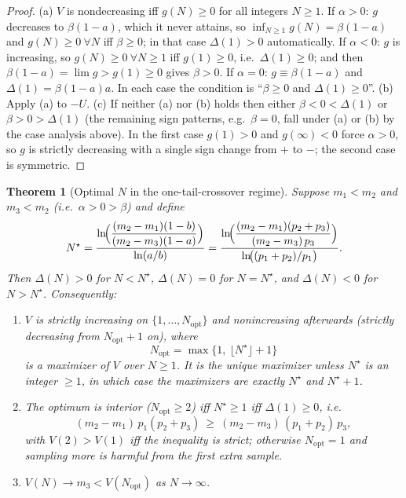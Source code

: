 \documentclass[11pt]{article}
\newtheorem{theorem}{Theorem}
\theoremstyle{definition}
\theoremstyle{remark}
\begin{document}
\begin{proof}
(a) $V$ is nondecreasing iff $g(N)\ge 0$ for all integers $N\ge1$.
If $\alpha>0$: $g$ decreases to $\beta(1-a)$, which it never attains, so
$\inf_{N\ge 1}g(N)=\beta(1-a)$ and $g(N)\ge0\ \forall N$ iff $\beta\ge0$; in that case
$\Delta(1)>0$ automatically.
If $\alpha<0$: $g$ is increasing, so $g(N)\ge0\ \forall N\ge1$ iff $g(1)\ge0$, i.e.\
$\Delta(1)\ge0$; and then $\beta(1-a)=\lim g>g(1)\ge0$ gives $\beta>0$.
If $\alpha=0$: $g\equiv\beta(1-a)$ and $\Delta(1)=\beta(1-a)a$.
In each case the condition is ``$\beta\ge0$ and $\Delta(1)\ge0$''.
(b) Apply (a) to $-U$.
(c) If neither (a) nor (b) holds then either $\beta<0<\Delta(1)$ or $\beta>0>\Delta(1)$
(the remaining sign patterns, e.g.\ $\beta=0$, fall under (a) or (b) by the case analysis
above). In the first case $g(1)>0$ and $g(\infty)<0$ force $\alpha>0$, so $g$ is strictly
decreasing with a single sign change from $+$ to $-$; the second case is symmetric.
\end{proof}

\begin{theorem}[Optimal $N$ in the one-tail-crossover regime]\label{thm:opt}
Suppose $m_1<m_2$ and $m_3<m_2$ (i.e.\ $\alpha>0>\beta$) and define
\begin{equation}\label{eq:Nstar}
N^\star=\frac{\ln\!\Bigl(\dfrac{(m_2-m_1)(1-b)}{(m_2-m_3)(1-a)}\Bigr)}{\ln(a/b)}
=\frac{\ln\!\Bigl(\dfrac{(m_2-m_1)(p_2+p_3)}{(m_2-m_3)\,p_3}\Bigr)}{\ln\!\bigl((p_1+p_2)/p_1\bigr)} .
\end{equation}
Then $\Delta(N)>0$ for $N<N^\star$, $\Delta(N)=0$ for $N=N^\star$, and $\Delta(N)<0$ for
$N>N^\star$. Consequently:
\begin{enumerate}[label=(\roman*)]
\item $V$ is strictly increasing on $\{1,\dots,N_{\mathrm{opt}}\}$ and nonincreasing afterwards
(strictly decreasing from $N_{\mathrm{opt}}+1$ on), where
\[
N_{\mathrm{opt}}=\max\bigl\{1,\ \lfloor N^\star\rfloor+1\bigr\}
\]
is a maximizer of $V$ over $N\ge1$. It is the unique maximizer unless $N^\star$ is an
integer $\ge1$, in which case the maximizers are exactly $N^\star$ and $N^\star+1$.
\item The optimum is interior ($N_{\mathrm{opt}}\ge2$) iff $N^\star\ge 1$ iff $\Delta(1)\ge 0$, i.e.
\[
(m_2-m_1)\,p_1(p_2+p_3)\ \ge\ (m_2-m_3)\,(p_1+p_2)\,p_3 ,
\]
with $V(2)>V(1)$ iff the inequality is strict; otherwise $N_{\mathrm{opt}}=1$ and sampling
more is harmful from the first extra sample.
\item $V(N)\to m_3<V(N_{\mathrm{opt}})$ as $N\to\infty$.
\end{enumerate}
\end{theorem}
\end{document}
